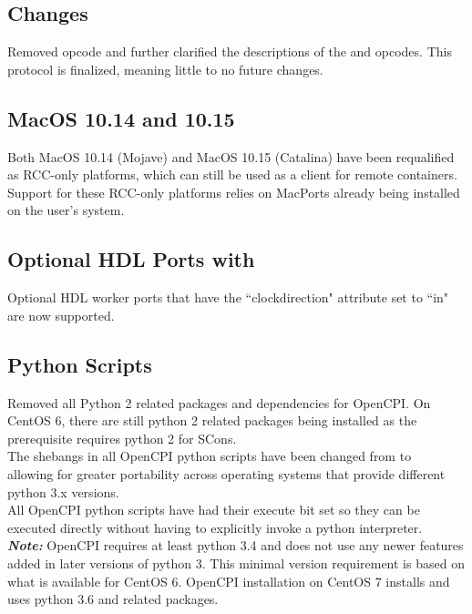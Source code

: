 \subsection{ Changes}
\label{sec:17_cswm}
Removed  opcode and further clarified the descriptions of the  and  opcodes. This protocol is finalized, meaning little to no future changes.

\subsection{MacOS 10.14 and 10.15}
\label{sec:17_mojave}
Both MacOS 10.14 (Mojave) and MacOS 10.15 (Catalina) have been requalified as RCC-only platforms, which can still be used as a client for remote containers. Support for these RCC-only platforms relies on MacPorts already being installed on the user's system.

\subsection{Optional HDL Ports with }
\label{sec:17_hdl_clockdirection}
Optional HDL worker ports that have the ``clockdirection" attribute set to ``in" are now supported.

\subsection{Python Scripts}
\label{sec:17_python_scripts}
Removed all Python 2 related packages and dependencies for OpenCPI. On CentOS 6, there are still python 2 related packages being installed as the  prerequisite requires python 2 for SCons.\\

The shebangs in all OpenCPI python scripts have been changed from  to\\  allowing for greater portability across operating systems that provide different python 3.x versions.\\

All OpenCPI python scripts have had their execute bit set so they can be executed directly without having to explicitly invoke a python interpreter.\\

\textit{\textbf{Note:}} OpenCPI requires at least python 3.4 and does not use any newer features added in later versions of python 3. This minimal version requirement is based on what is available for CentOS 6. OpenCPI installation on CentOS 7 installs and uses python 3.6 and related packages.

